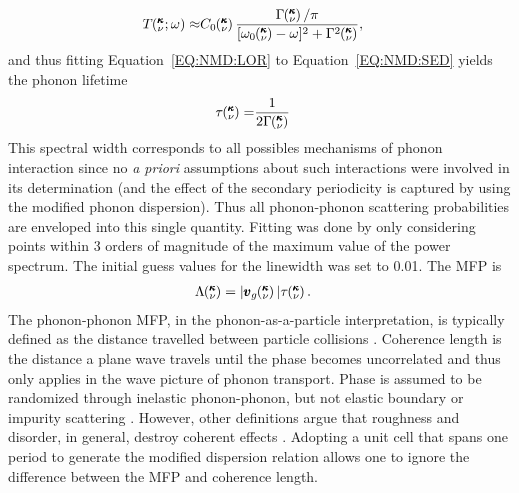 \documentclass[aps,prb,preprint,preprintnumbers,amsmath,amssymb,floatfix,superscriptaddress]{revtex4}
\newcommand{\kvw}{\mspace{-4.0mu}\left(\mspace{-8.0mu}
\begin{smallmatrix}&\pmb{\kappa} \\&\nu\end{smallmatrix}
\mspace{-2.0mu};\omega\right)}
\newcommand{\kv}{\mspace{-4.0mu}\left(\mspace{-8.0mu}
\begin{smallmatrix}&\pmb{\kappa} \\&\nu\end{smallmatrix}
\mspace{-3.0mu}\right)}
\begin{document}
\begin{equation}\label{EQ:NMD:LOR}
\begin{split}
T\kvw\approx&C_0\kv\frac{\Gamma\kv/\pi}{[\omega_0\kv-\omega]^2+\Gamma^2\kv},
\end{split}
\end{equation}
and thus fitting Equation~\ref{EQ:NMD:LOR} to Equation~\ref{EQ:NMD:SED} yields the phonon lifetime
\begin{equation}\label{EQ:lifetime}
\begin{split}
\tau\kv=&\frac{1}{2\Gamma\kv}
\end{split}
\end{equation}
This spectral width corresponds to all possibles mechanisms of phonon interaction since no \textit{a priori} assumptions about such interactions were involved in its determination (and the effect of the secondary periodicity is captured by using the modified phonon dispersion). Thus all phonon-phonon scattering probabilities are enveloped into this single quantity. Fitting was done by only considering points within 3 orders of magnitude of the maximum value of the power spectrum. The initial guess values for the linewidth was set to 0.01. The MFP is
\begin{equation}\label{EQ:M:phonon_mfp}
\begin{split}
\Lambda\kv &= |\pmb{v}_{g}\kv {}| \tau\kv.
\end{split}
\end{equation}
The phonon-phonon MFP, in the phonon-as-a-particle interpretation, is typically defined as the distance travelled between particle collisions \cite{ziman_electrons_2001}. Coherence length is the distance a plane wave travels until the phase becomes uncorrelated and thus only applies in the wave picture of phonon transport. Phase is assumed to be randomized through inelastic phonon-phonon, but not elastic boundary or impurity scattering \cite{chen2005nanoscale}. However, other definitions argue that roughness and disorder, in general, destroy coherent effects \cite{PhysRevB.67.195311,dames:682}. Adopting a unit cell that spans one period to generate the modified dispersion relation allows one to ignore the difference between the MFP and coherence length.
\end{document}
